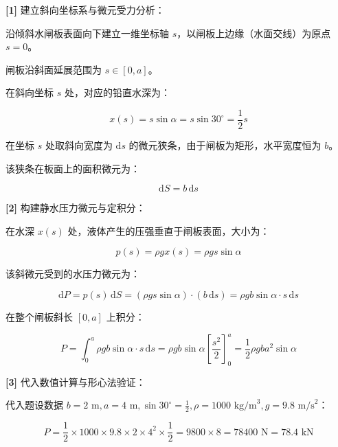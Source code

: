 \documentclass[11pt,a4paper,UTF8]{ctexart}
\begin{document}
\begin{solbox}[分步推导与答题规范]
\textbf{[1]} 建立斜向坐标系与微元受力分析：

沿倾斜水闸板表面向下建立一维坐标轴 $s$，以闸板上边缘（水面交线）为原点 $s = 0$。

闸板沿斜面延展范围为 $s \in [0, a]$。

在斜向坐标 $s$ 处，对应的铅直水深为：


\begin{equation*}
x(s) = s \sin\alpha = s \sin 30^\circ = \frac{1}{2}s
\end{equation*}


在坐标 $s$ 处取斜向宽度为 $\mathrm{d}s$ 的微元狭条，由于闸板为矩形，水平宽度恒为 $b$。

该狭条在板面上的面积微元为：


\begin{equation*}
\mathrm{d}S = b\,\mathrm{d}s
\end{equation*}


\textbf{[2]} 构建静水压力微元与定积分：

在水深 $x(s)$ 处，液体产生的压强垂直于闸板表面，大小为：


\begin{equation*}
p(s) = \rho g x(s) = \rho g s \sin\alpha
\end{equation*}


该斜微元受到的水压力微元为：


\begin{equation*}
\mathrm{d}P = p(s)\,\mathrm{d}S = (\rho g s \sin\alpha) \cdot (b\,\mathrm{d}s) = \rho g b \sin\alpha \cdot s\,\mathrm{d}s
\end{equation*}


在整个闸板斜长 $[0, a]$ 上积分：


\begin{equation*}
P = \int_0^a \rho g b \sin\alpha \cdot s\,\mathrm{d}s = \rho g b \sin\alpha \left[\frac{s^2}{2}\right]_0^a = \frac{1}{2}\rho g b a^2 \sin\alpha
\end{equation*}


\textbf{[3]} 代入数值计算与形心法验证：

代入题设数据 $b = 2\text{ m}, a = 4\text{ m}, \sin 30^\circ = \frac{1}{2}, \rho = 1000\text{ kg/m}^3, g = 9.8\text{ m/s}^2$：


\begin{equation*}
P = \frac{1}{2} \times 1000 \times 9.8 \times 2 \times 4^2 \times \frac{1}{2} = 9800 \times 8 = 78400\text{ N} = 78.4\text{ kN}
\end{equation*}



\end{solbox}
\end{document}
